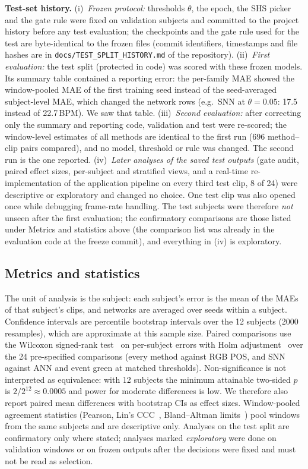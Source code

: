 \documentclass[10pt,journal]{IEEEtran}
\begin{document}
\textbf{Test-set history.} (i)~\emph{Frozen protocol:} thresholds $\theta$, the epoch, the SHS picker and the gate rule were fixed on validation subjects and committed to the project history before any test evaluation; the checkpoints and the gate rule used for the test are byte-identical to the frozen files (commit identifiers, timestamps and file hashes are in \texttt{docs/TEST\_SPLIT\_HISTORY.md} of the repository). (ii)~\emph{First evaluation:} the test split (protected in code) was scored with these frozen models. Its summary table contained a reporting error: the per-family MAE showed the window-pooled MAE of the first training seed instead of the seed-averaged subject-level MAE, which changed the network rows (e.g.\ SNN at $\theta=0.05$: 17.5 instead of 22.7\,BPM). We saw that table. (iii)~\emph{Second evaluation:} after correcting only the summary and reporting code, validation and test were re-scored; the window-level estimates of all methods are identical to the first run (696 method--clip pairs compared), and no model, threshold or rule was changed. The second run is the one reported. (iv)~\emph{Later analyses of the saved test outputs} (gate audit, paired effect sizes, per-subject and stratified views, and a real-time re-implementation of the application pipeline on every third test clip, 8 of 24) were descriptive or exploratory and changed no choice. One test clip was also opened once while debugging frame-rate handling. The test subjects were therefore \emph{not} unseen after the first evaluation; the confirmatory comparisons are those listed under Metrics and statistics above (the comparison list was already in the evaluation code at the freeze commit), and everything in (iv) is exploratory.
\subsection{Metrics and statistics}
The unit of analysis is the subject: each subject's error is the mean of the MAEs of that subject's clips, and networks are averaged over seeds within a subject. Confidence intervals are percentile bootstrap intervals over the 12 subjects (2000 resamples), which are approximate at this sample size. Paired comparisons use the Wilcoxon signed-rank test~\cite{wilcoxon1945} on per-subject errors with Holm adjustment~\cite{holm1979} over the 24 pre-specified comparisons (every method against RGB POS, and SNN against ANN and event green at matched thresholds). Non-significance is not interpreted as equivalence: with 12 subjects the minimum attainable two-sided $p$ is $2/2^{12}\approx0.0005$ and power for moderate differences is low. We therefore also report paired mean differences with bootstrap CIs as effect sizes. Window-pooled agreement statistics (Pearson, Lin's CCC~\cite{lin1989ccc}, Bland--Altman limits~\cite{bland1986}) pool windows from the same subjects and are descriptive only. Analyses on the test split are confirmatory only where stated; analyses marked \emph{exploratory} were done on validation windows or on frozen outputs after the decisions were fixed and must not be read as selection.
\end{document}
